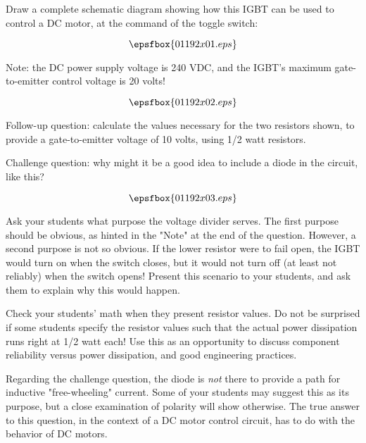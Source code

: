 

Draw a complete schematic diagram showing how this IGBT can be used to control a DC motor, at the command of the toggle switch:

\vskip 50pt

$$\epsfbox{01192x01.eps}$$

\vskip 50pt

Note: the DC power supply voltage is 240 VDC, and the IGBT's maximum gate-to-emitter control voltage is 20 volts! 







$$\epsfbox{01192x02.eps}$$

Follow-up question: calculate the values necessary for the two resistors shown, to provide a gate-to-emitter voltage of 10 volts, using 1/2 watt resistors.

\vskip 10pt

Challenge question: why might it be a good idea to include a diode in the circuit, like this?

$$\epsfbox{01192x03.eps}$$







Ask your students what purpose the voltage divider serves.  The first purpose should be obvious, as hinted in the "Note" at the end of the question.  However, a second purpose is not so obvious.  If the lower resistor were to fail open, the IGBT would turn on when the switch closes, but it would not turn off (at least not reliably) when the switch opens!  Present this scenario to your students, and ask them to explain why this would happen.

Check your students' math when they present resistor values.  Do not be surprised if some students specify the resistor values such that the actual power dissipation runs right at 1/2 watt each!  Use this as an opportunity to discuss component reliability versus power dissipation, and good engineering practices.

Regarding the challenge question, the diode is {\it not} there to provide a path for inductive "free-wheeling" current.  Some of your students may suggest this as its purpose, but a close examination of polarity will show otherwise.  The true answer to this question, in the context of a DC motor control circuit, has to do with the behavior of DC motors.




